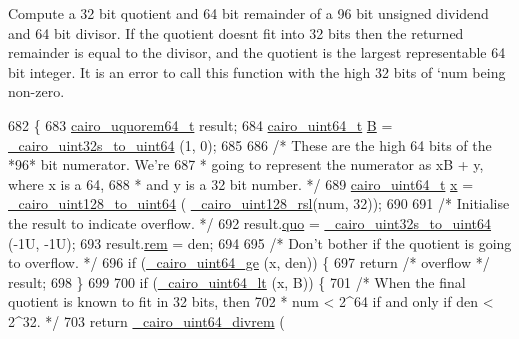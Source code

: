 Compute a 32 bit quotient and 64 bit remainder of a 96 bit unsigned dividend and 64 bit divisor. If the quotient doesn\textquotesingle{}t fit into 32 bits then the returned remainder is equal to the divisor, and the quotient is the largest representable 64 bit integer. It is an error to call this function with the high 32 bits of `num\textquotesingle{} being non-\/zero. 
\begin{DoxyCode}
682 \{
683     \hyperlink{struct__cairo__uquorem64}{cairo\_uquorem64\_t} result;
684     \hyperlink{cairo-wideint-private_8h_addac97960d28a0f1b58a5abefd21b14b}{cairo\_uint64\_t} \hyperlink{generate__test__data__lte__sinr_8m_abccb2cfa2bf43e135bc0e10740453f8c}{B} = \hyperlink{cairo-wideint_8c_a6ceaa8499ff57c64a3662d1a3f4c2a1f}{\_cairo\_uint32s\_to\_uint64} (1, 0);
685 
686     \textcolor{comment}{/* These are the high 64 bits of the *96* bit numerator.  We're}
687 \textcolor{comment}{     * going to represent the numerator as xB + y, where x is a 64,}
688 \textcolor{comment}{     * and y is a 32 bit number. */}
689     \hyperlink{cairo-wideint-private_8h_addac97960d28a0f1b58a5abefd21b14b}{cairo\_uint64\_t} \hyperlink{lte__link__budget__x2__handover__measures_8m_a9336ebf25087d91c818ee6e9ec29f8c1}{x} = \hyperlink{cairo-wideint-private_8h_a9a76ef52b513bb1b8dad9c401d707084}{\_cairo\_uint128\_to\_uint64} (
      \hyperlink{cairo-wideint_8c_a6591001de314b365318db0edc7950fde}{\_cairo\_uint128\_rsl}(num, 32));
690 
691     \textcolor{comment}{/* Initialise the result to indicate overflow. */}
692     result.\hyperlink{struct__cairo__uquorem64_aa1ba1d4582ee46d1769ff01d63242ac8}{quo} = \hyperlink{cairo-wideint_8c_a6ceaa8499ff57c64a3662d1a3f4c2a1f}{\_cairo\_uint32s\_to\_uint64} (-1U, -1U);
693     result.\hyperlink{struct__cairo__uquorem64_af360df0b81f94d6ac85f4cec13bb7431}{rem} = den;
694 
695     \textcolor{comment}{/* Don't bother if the quotient is going to overflow. */}
696     \textcolor{keywordflow}{if} (\hyperlink{cairo-wideint-private_8h_a5be6bbec2247f8f89c0904b9aa6fc012}{\_cairo\_uint64\_ge} (x, den)) \{
697         \textcolor{keywordflow}{return} \textcolor{comment}{/* overflow */} result;
698     \}
699 
700     \textcolor{keywordflow}{if} (\hyperlink{cairo-wideint-private_8h_a2cc85e3ec519a71b4c52f6e43affdace}{\_cairo\_uint64\_lt} (x, B)) \{
701         \textcolor{comment}{/* When the final quotient is known to fit in 32 bits, then}
702 \textcolor{comment}{         * num < 2^64 if and only if den < 2^32. */}
703         \textcolor{keywordflow}{return} \hyperlink{cairo-wideint_8c_a621ed7ef4c3a60376cf0296db7a9cbef}{\_cairo\_uint64\_divrem} (

\end{DoxyCode}
